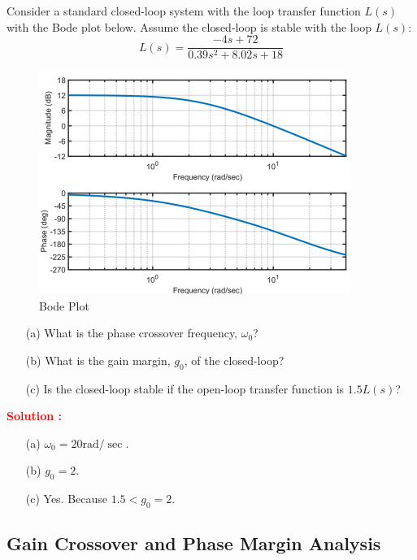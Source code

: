 \documentclass[12pt]{article}
\begin{document}
Consider a standard closed-loop system with the loop transfer function $L(s)$ with the Bode plot below.  Assume the closed-loop is stable with the loop $L(s)$:
\begin{equation*}
    L(s) = \frac{-4s+72}{0.39s^2+8.02s+18}
\end{equation*}
\begin{figure}[H]
\centering
\includegraphics[width=0.9\textwidth]{figs/6.1.png}
\caption{Bode Plot}
\end{figure}
\begin{itemize}
    \item[(a)] What is the phase crossover frequency, $\omega_0$?
    \item[(b)] What is the gain margin, $g_0$, of the closed-loop? 
    \item[(c)] Is the closed-loop stable if the open-loop transfer function is $1.5L(s)$?
    \end{itemize}
\textbf{\textcolor{red}{Solution :}} \\
\begin{itemize}
    \item[(a)] $\omega_0 = 20 \text{rad}/\sec.$
    \item[(b)] $g_0 = 2$.
    \item[(c)] Yes. Because $1.5 < g_0 = 2$.
\end{itemize}
\clearpage

\subsection{Gain Crossover and Phase Margin Analysis}
\end{document}
